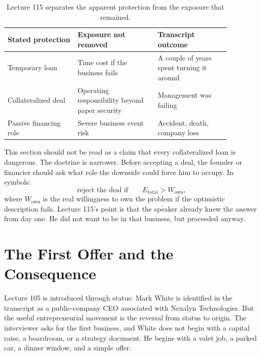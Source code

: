 \documentclass[11pt,oneside]{book}
\begin{document}
\begin{table}
\centering
\small
\begin{tabular}{p{0.27\linewidth}p{0.31\linewidth}p{0.29\linewidth}}
\hline
Stated protection & Exposure not removed & Transcript outcome\\
\hline
Temporary loan & Time cost if the business fails & A couple of years spent turning it around\\
Collateralized deal & Operating responsibility beyond paper security & Management was failing\\
Passive financing role & Severe business event risk & Accident, death, company loss\\
\hline
\end{tabular}
\caption{Lecture 115 separates the apparent protection from the exposure that remained.}
\end{table}

This section should not be read as a claim that every collateralized loan is dangerous. The doctrine is narrower. Before accepting a deal, the founder or financier should ask what role the downside could force him to occupy. In symbols:
\[
\text{reject the deal if}
\qquad
E_{\mathrm{total}}>W_{\mathrm{own}},
\]
where \(W_{\mathrm{own}}\) is the real willingness to own the problem if the optimistic description fails. Lecture 115's point is that the speaker already knew the answer from day one. He did not want to be in that business, but proceeded anyway.


\chapter{The First Offer and the Consequence}

Lecture 105 is introduced through status: Mark White is identified in the transcript as a public-company CEO associated with Nexalyn Technologies. But the useful entrepreneurial movement is the reversal from status to origin. The interviewer asks for the first business, and White does not begin with a capital raise, a boardroom, or a strategy document. He begins with a valet job, a parked car, a dinner window, and a simple offer.
\end{document}
